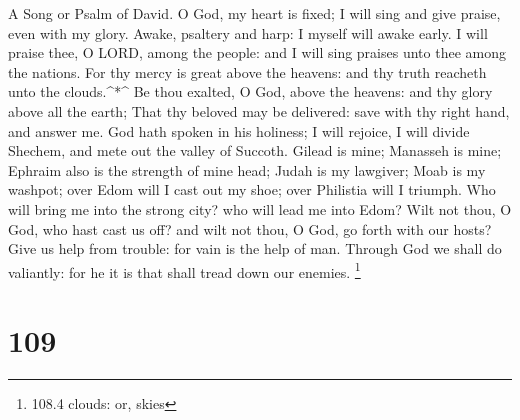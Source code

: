 A Song or Psalm of David.  O God, my heart is fixed; I will
sing and give praise, even with my glory.  Awake, psaltery
and harp: I myself will awake early.  I will praise thee, O
LORD, among the people: and I will sing praises unto thee among the
nations.  For thy mercy is great above the heavens: and thy
truth reacheth unto the clouds.\^{}*\^{}  Be thou exalted, O
God, above the heavens: and thy glory above all the earth; 
That thy beloved may be delivered: save with thy right hand, and answer
me.  God hath spoken in his holiness; I will rejoice, I will
divide Shechem, and mete out the valley of Succoth.  Gilead
is mine; Manasseh is mine; Ephraim also is the strength of mine head;
Judah is my lawgiver;  Moab is my washpot; over Edom will I
cast out my shoe; over Philistia will I triumph.  Who will
bring me into the strong city? who will lead me into Edom? 
Wilt not thou, O God, who hast cast us off? and wilt not thou, O God, go
forth with our hosts?  Give us help from trouble: for vain
is the help of man.  Through God we shall do valiantly: for
he it is that shall tread down our enemies. \footnote{108.4 clouds: or,
  skies}

\hypertarget{section-108}{%
\section{109}\label{section-108}}

